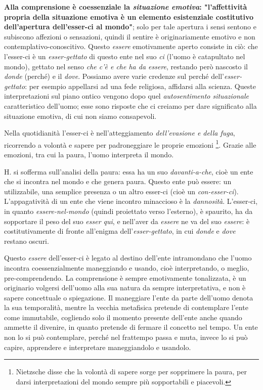 \documentclass[a4paper,12pt,oneside]{article}%
\begin{document}
\textbf{Alla comprensione è coessenziale la \textit{situazione emotiva}: "l'affettività propria della situazione emotiva è un elemento esistenziale costitutivo dell'apertura dell'esser-ci al mondo"}; solo per tale apertura i sensi sentono e subiscono affezioni o sensazioni, quindi il sentire è originariamente emotivo e non contemplativo-conoscitivo. Questo \textit{essere} emotivamente aperto consiste in ciò: che l'esser-ci è un \textit{esser-gettato} di questo ente nel suo \textit{ci} (l'uomo è catapultato nel mondo), gettato nel senso \textit{che c'è e che ha da essere}, restando però nascosto il \textit{donde} (perché) e il \textit{dove}. Possiamo avere varie credenze sul perché dell'\textit{esser-gettato}: per esempio appellarsi ad una fede religiosa, affidarsi alla scienza. Queste interpretazioni sul piano ontico vengono dopo quel \textit{autosentimento situazionale} caratteristico dell'uomo; esse sono risposte che ci creiamo per dare significato alla situazione emotiva, di cui non siamo consapevoli.

Nella quotidianità l'esser-ci è nell'atteggiamento \textit{dell'evasione e della fuga}, ricorrendo a volontà e sapere per padroneggiare le proprie emozioni \footnote{Nietzsche disse che la volontà di sapere sorge per sopprimere la paura, per darsi interpretazioni del mondo sempre più sopportabili e piacevoli.}. Grazie alle emozioni, tra cui la paura, l'uomo interpreta il mondo.

H. si sofferma sull'analisi della paura: essa ha un suo \textit{davanti-a-che}, cioè un ente che si incontra nel mondo e che genera paura. Questo ente può essere: un utilizzabile, una semplice presenza o un altro esser-ci (cioè un \textit{con-esser-ci}). L'appagatività di un ente che viene incontro minaccioso è la \textit{dannosità}. L'esser-ci, in quanto \textit{essere-nel-mondo} (quindi proiettato verso l'esterno), è spaurito, ha da sopportare il peso del suo \textit{esser qui}, e nell'aver da \textit{essere} ne va del suo \textit{essere}: è costitutivamente di fronte all'enigma dell'\textit{esser-gettato}, in cui \textit{donde} e \textit{dove}  restano oscuri.

Questo \textit{essere} dell'esser-ci è legato al destino dell'ente intramondano che l'uomo incontra coessenzialmente maneggiando e usando, cioè interpretando, o meglio, pre-comprendendo. La comprensione è sempre emotivamente tonalizzata, è un originario volgersi dell'uomo alla sua natura da sempre interpretativa, e non è sapere concettuale o spiegazione. Il maneggiare l'ente da parte dell'uomo denota la sua temporalità, mentre la vecchia metafisica pretende di contemplare l'ente come immutabile, cogliendo solo il momento presente dell'ente anche quando ammette il divenire, in quanto pretende di fermare il concetto nel tempo. Un ente non lo si può contemplare, perché nel frattempo passa e muta, invece lo si può capire, apprendere e interpretare maneggiandolo e usandolo.
\end{document}

